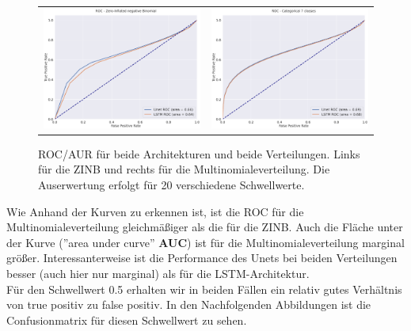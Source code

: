\begin{figure}[h]
\begin{tabular}{cc}
\includegraphics[width=70mm]{abb/ROC_ZINFBINOM.png}&
\includegraphics[width=70mm]{abb/ROC_Categorical.png}
\end{tabular}
\caption{ROC/AUR für beide Architekturen und beide Verteilungen. Links für die ZINB und rechts für die Multinomialeverteilung.
Die Auserwertung erfolgt für 20 verschiedene Schwellwerte. \label{fig:anomerz}}
\end{figure}

\noindent Wie Anhand der Kurven zu erkennen ist, ist die ROC für die Multinomialeverteilung gleichmäßiger als die für die ZINB. 
Auch die Fläche unter der Kurve (''area under curve'' \textbf{AUC}) ist für die Multinomialeverteilung marginal größer. Interessanterweise ist die Performance des Unets bei beiden Verteilungen besser (auch hier nur marginal) als für die LSTM-Architektur.\\

\noindent Für den Schwellwert 0.5 erhalten wir in beiden Fällen ein relativ gutes Verhältnis von true positiv zu false positiv. In den Nachfolgenden Abbildungen ist die Confusionmatrix für diesen Schwellwert zu sehen.



